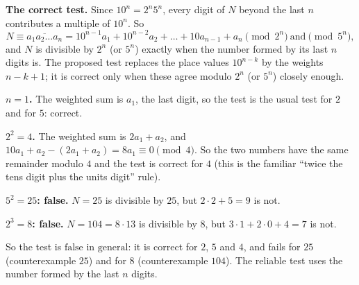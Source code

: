 \textbf{The correct test.} Since $10^n=2^n5^n$, every digit of $N$ beyond the last $n$ contributes a multiple of $10^n$. So
\[
N\equiv\overline{a_1a_2\ldots a_n}=10^{n-1}a_1+10^{n-2}a_2+\dots+10a_{n-1}+a_n \pmod{2^n}\ \text{and}\pmod{5^n},
\]
and $N$ is divisible by $2^n$ (or $5^n$) exactly when the number formed by its last $n$ digits is. The proposed test replaces the place values $10^{n-k}$ by the weights $n-k+1$; it is correct only when these agree modulo $2^n$ (or $5^n$) closely enough.

\textbf{$n=1$.} The weighted sum is $a_1$, the last digit, so the test is the usual test for $2$ and for $5$: correct.

\textbf{$2^2=4$.} The weighted sum is $2a_1+a_2$, and $10a_1+a_2-(2a_1+a_2)=8a_1\equiv0\pmod4$. So the two numbers have the same remainder modulo $4$ and the test is correct for $4$ (this is the familiar ``twice the tens digit plus the units digit'' rule).

\textbf{$5^2=25$: false.} $N=25$ is divisible by $25$, but $2\cdot2+5=9$ is not.

\textbf{$2^3=8$: false.} $N=104=8\cdot13$ is divisible by $8$, but $3\cdot1+2\cdot0+4=7$ is not.

So the test is $\boxed{\text{false in general}}$: it is correct for $2$, $5$ and $4$, and fails for $25$ (counterexample $25$) and for $8$ (counterexample $104$). The reliable test uses the number formed by the last $n$ digits.

